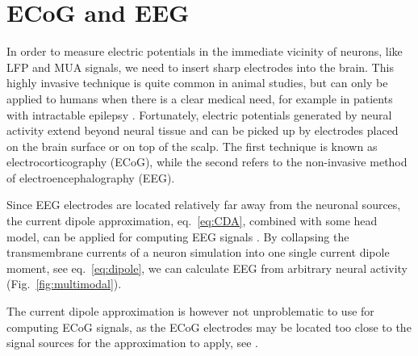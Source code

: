 \documentclass[preprint,11pt,authoryear]{elsarticle}
\newcommand{\hlj}[2][OliveGreen]{ {\sethlcolor{#1} \hl{#2}} }
\newcommand{\hlp}[2][Purple]{ {\sethlcolor{#1} \hl{#2}} }
\newcommand{\gex}[1]{{\color{red}#1}}
\newcommand{\tvnnote}[1]{\color{white}{\hlj{TVN: #1 }}\color{black}}
\newcommand{\snnote}[1]{\color{white}{\hlp{SN: #1 }}\color{black}}
\newcommand{\slntxt}[1]{{\color{RoyalPurple}#1}}
\begin{document}
\section{ECoG and EEG}
\label{sec:EEG}
In order to measure electric potentials in the immediate vicinity of neurons, like LFP and MUA signals,
we need to insert sharp electrodes into the brain. This highly invasive technique is quite common in animal studies, but can only be applied to humans when there is a clear medical need, for example in patients with intractable epilepsy \citep{Zangiabadi2019}. Fortunately, electric potentials generated by neural activity extend beyond neural tissue and can be picked up by electrodes placed on the brain surface or on top of the scalp. The first technique is known as electrocorticography (ECoG), while the second refers to the non-invasive method of electroencephalography (EEG). 

Since EEG electrodes are located relatively far away from the neuronal sources, the current dipole approximation, eq.~\eqref{eq:CDA}, combined with some head model, can be applied for computing EEG signals \citep{Nunez2006,Ilmoniemi2019}. By collapsing the transmembrane currents of a neuron simulation into one single current dipole moment, see eq.~\eqref{eq:dipole}, we can calculate EEG from arbitrary neural activity (Fig.~\ref{fig:multimodal}).

The current dipole approximation is however not \gex{unproblematic to use for computing ECoG signals, as the ECoG electrodes may be located too close to the 
signal sources for the approximation to apply}, see \cite{Hagen2018}.
\end{document}
